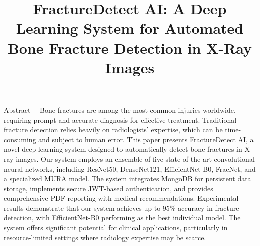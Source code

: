 \documentclass[conference]{IEEEtran}
\begin{document}
\title{FractureDetect AI: A Deep Learning System for Automated Bone Fracture Detection in X-Ray Images}

\author{
\and
{}
\and
{}
\and
{}
}

\maketitle

\noindent Abstract— Bone fractures are among the most common injuries worldwide, requiring prompt and accurate diagnosis for effective treatment. Traditional fracture detection relies heavily on radiologists' expertise, which can be time-consuming and subject to human error. This paper presents FractureDetect AI, a novel deep learning system designed to automatically detect bone fractures in X-ray images. Our system employs an ensemble of five state-of-the-art convolutional neural networks, including ResNet50, DenseNet121, EfficientNet-B0, FracNet, and a specialized MURA model. The system integrates MongoDB for persistent data storage, implements secure JWT-based authentication, and provides comprehensive PDF reporting with medical recommendations. Experimental results demonstrate that our system achieves up to 95\% accuracy in fracture detection, with EfficientNet-B0 performing as the best individual model. The system offers significant potential for clinical applications, particularly in resource-limited settings where radiology expertise may be scarce.
\end{document}
